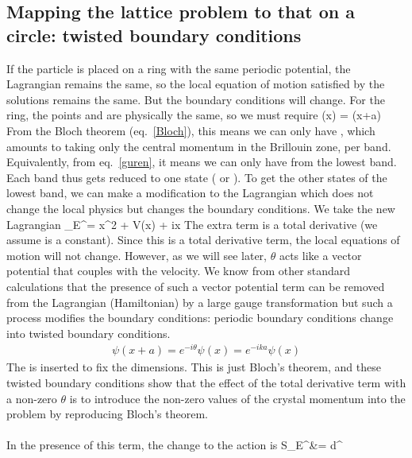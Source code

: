 \documentclass[12pt]{article}
\begin{document}
\subsection*{Mapping the lattice problem to that on a circle: twisted boundary conditions}
If the particle is placed on a ring with the same periodic potential, the Lagrangian remains the same, so the local equation of motion satisfied by the solutions remains the same. But the boundary conditions will change. For the ring, the points  and  are physically the same, so we must require 
\beq
\psi(x) = \psi(x+a)
\eeq
From the Bloch theorem (eq.~\ref{Bloch}), this means we can only have , which amounts to taking only the central momentum in the Brillouin zone, per band. Equivalently, from eq.~\ref{guren}, it means we can only have  from the lowest band. Each band thus gets reduced to one state ( or ). To get the other states of the lowest band, we can make a modification to the Lagrangian which does not change the local physics but changes the boundary conditions. We take the new Lagrangian
\beq[newl]
_E^\prime= \dot x^2 + V(x) + i\dot x
\eeq
The extra term is a total derivative (we assume \il{\theta} is a constant). Since this is a total derivative term, the local equations of motion will not change. However, as we will see later, \(\theta\) acts like a vector potential that couples with the velocity. We know from other standard calculations that the presence of such a vector potential term can be removed from the Lagrangian (Hamiltonian) by a large gauge transformation but such a process modifies the boundary conditions: periodic boundary conditions change into twisted boundary conditions.
\begin{equation}\begin{aligned}
	\psi(x+a) = e^{-i\theta}\psi(x) = e^{-ika}\psi(x)
\end{aligned}\end{equation}
The \il{\hbar} is inserted to fix the dimensions. This is just Bloch's theorem, and these twisted boundary conditions show that the effect of the total derivative term with a non-zero \(\theta\) is to introduce the non-zero values of the crystal momentum into the problem by reproducing Bloch's theorem.\\\\
In the presence of this term, the change to the action is
\beq
S_E^\prime &= \int d\tau^\prime {} \\
\end{document}
